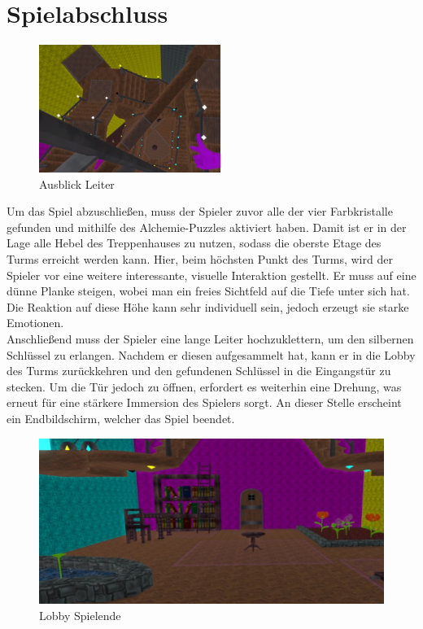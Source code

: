 \section{Spielabschluss}
\begin{figure}
	\vspace*{-0.5cm}
	\includegraphics[width=5.9cm]{Pictures/Ausblick_Leiter}
	\caption{Ausblick Leiter}
	\vspace*{-0.5cm}
	\label{fig:leiter}
\end{figure}
Um das Spiel abzuschließen, muss der Spieler zuvor alle der vier Farbkristalle gefunden und mithilfe des Alchemie-Puzzles aktiviert haben. Damit ist er in der Lage alle Hebel des Treppenhauses zu nutzen, sodass die oberste Etage des Turms erreicht werden kann. Hier, beim höchsten Punkt des Turms, wird der Spieler vor eine weitere interessante, visuelle Interaktion gestellt. Er muss auf eine dünne Planke steigen, wobei man ein freies Sichtfeld auf die Tiefe unter sich hat. Die Reaktion auf diese Höhe kann sehr individuell sein, jedoch erzeugt sie starke Emotionen.\\
Anschließend muss der Spieler eine lange Leiter hochzuklettern, um den silbernen Schlüssel zu erlangen. Nachdem er diesen aufgesammelt hat, kann er in die Lobby des Turms zurückkehren und den gefundenen Schlüssel in die Eingangstür zu stecken. Um die Tür jedoch zu öffnen, erfordert es weiterhin eine Drehung, was erneut für eine stärkere Immersion des Spielers sorgt. An dieser Stelle erscheint ein Endbildschirm, welcher das Spiel beendet.
\begin{figure}[h]
	\centering
	\includegraphics[width=\textwidth/2]{Pictures/Lobby_Final}
	\caption{Lobby Spielende}
	\label{fig:lobby_final}
\end{figure}\\
